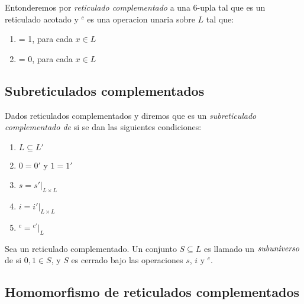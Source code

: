   \begin{definition}
    Entonderemos por \emph{reticulado complementado} a una 6-upla \reticulCompl tal que \reticulAcot es un
    reticulado acotado y ${}^c$ es una operacion unaria sobre $L$ tal que:
    \begin{enumerate}
      \item {} = 1, para cada $x \in L$
      \item {} = 0, para cada $x \in L$
    \end{enumerate}
  \end{definition}

  \subsection{Subreticulados complementados}
  \begin{definition}
    Dados reticulados complementados \reticulCompl y  diremos que
    \reticulCompl es un \emph{subreticulado complementado de}  si se
    dan las siguientes condiciones:
    \begin{enumerate}
      \item $L \subseteq L'$
      \item $0 = 0'$ y $1 = 1'$
      \item $s = s'\vert_{L \times L}$
      \item $i = i'\vert_{L \times L}$
      \item ${}^c = {}^{c'}\vert_L$
    \end{enumerate}

    Sea \reticulCompl un reticulado complementado. Un conjunto $S \subseteq L$ es llamado un $\emph{subuniverso}$ de
    \reticulCompl si $0, 1 \in S$, y $S$ es cerrado bajo las operaciones $s$, $i$ y ${}^c$.
  \end{definition}

  \subsection{Homomorfismo de reticulados complementados}

